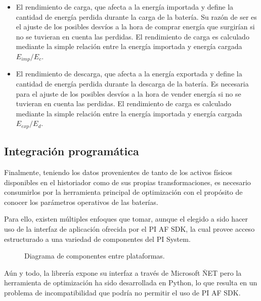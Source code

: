 \begin{itemize}

  \item El rendimiento de carga, que afecta a la energía importada y define la cantidad de energía perdida durante la carga de la batería. Su razón de ser es el ajuste de los posibles desvíos a la hora de comprar energía que surgirían si no se tuvieran en cuenta las perdidas. El rendimiento de carga es calculado mediante la simple relación entre la energía importada y energía cargada \( E_{imp} / E_c \).

  \item El rendimiento de descarga, que afecta a la energía exportada y define la cantidad de energía perdida durante la descarga de la batería. Es necesaria para el ajuste de los posibles desvíos a la hora de vender energía si no se tuvieran en cuenta las perdidas. El rendimiento de carga es calculado mediante la simple relación entre la energía importada y energía cargada \( E_{exp} / E_d \).

\end{itemize}

\subsection{Integración programática}
\label{makereference3.5.2}

Finalmente, teniendo los datos provenientes de tanto de los activos físicos disponibles en el historiador como de sus propias transformaciones, es necesario consumirlos por la herramienta principal de optimización con el propósito de conocer los parámetros operativos de las baterías.

Para ello, existen múltiples enfoques que tomar, aunque el elegido a sido hacer uso de la interfaz de aplicación ofrecida por el PI AF SDK, la cual provee acceso estructurado a una variedad de componentes del PI System.

\begin{figure}
  \centering
  \caption{Diagrama de componentes entre plataformas.}
  \label{fig:integración-programatica}
\end{figure}

Aún y todo, la librería expone su interfaz a través de Microsoft \.NET pero la herramienta de optimización ha sido desarrollada en Python, lo que resulta en un problema de incompatibilidad que podría no permitir el uso de PI AF SDK\@.

